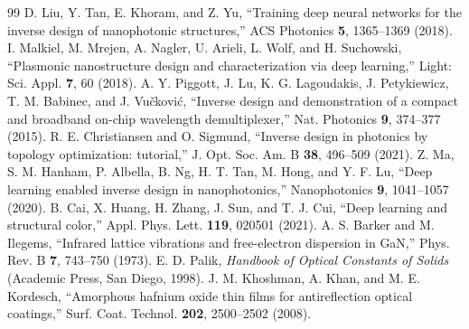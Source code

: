 \documentclass[10pt,twocolumn]{article}
\begin{document}
\begin{thebibliography}{99}
 D. Liu, Y. Tan, E. Khoram, and Z. Yu, ``Training deep neural networks for the inverse design of nanophotonic structures,'' ACS Photonics \textbf{5}, 1365--1369 (2018).
 I. Malkiel, M. Mrejen, A. Nagler, U. Arieli, L. Wolf, and H. Suchowski, ``Plasmonic nanostructure design and characterization via deep learning,'' Light: Sci. Appl. \textbf{7}, 60 (2018).
 A. Y. Piggott, J. Lu, K. G. Lagoudakis, J. Petykiewicz, T. M. Babinec, and J. Vu\v{c}kovi\'c, ``Inverse design and demonstration of a compact and broadband on-chip wavelength demultiplexer,'' Nat. Photonics \textbf{9}, 374--377 (2015).
 R. E. Christiansen and O. Sigmund, ``Inverse design in photonics by topology optimization: tutorial,'' J. Opt. Soc. Am. B \textbf{38}, 496--509 (2021).
 Z. Ma, S. M. Hanham, P. Albella, B. Ng, H. T. Tan, M. Hong, and Y. F. Lu, ``Deep learning enabled inverse design in nanophotonics,'' Nanophotonics \textbf{9}, 1041--1057 (2020).
 B. Cai, X. Huang, H. Zhang, J. Sun, and T. J. Cui, ``Deep learning and structural color,'' Appl. Phys. Lett. \textbf{119}, 020501 (2021).
 A. S. Barker and M. Ilegems, ``Infrared lattice vibrations and free-electron dispersion in GaN,'' Phys. Rev. B \textbf{7}, 743--750 (1973).
 E. D. Palik, \textit{Handbook of Optical Constants of Solids} (Academic Press, San Diego, 1998).
 J. M. Khoshman, A. Khan, and M. E. Kordesch, ``Amorphous hafnium oxide thin films for antireflection optical coatings,'' Surf. Coat. Technol. \textbf{202}, 2500--2502 (2008).
\end{thebibliography}
\end{document}
